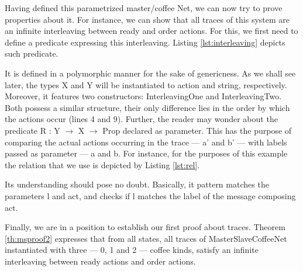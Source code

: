 	\noindent Having defined this parametrized master/coffee \textsf{Net}, we can
	now try to prove properties about it. For instance, we can show that all traces
	of this system are an infinite interleaving between \textsf{ready} and \textsf{order}
	\textsf{actions}. For this, we first need to define a predicate expressing
	this interleaving. Listing \ref{lst:interleaving} depicts such predicate.

					

	\noindent It is defined in a polymorphic manner for the sake of genericness.
	As we shall see later, the types \textsf{X} and \textsf{Y} will be instantiated to
	\textsf{action} and \textsf{string}, respectively.			
	Moreover, it features two constructors: \textsf{InterleavingOne} and \textsf{InterleavingTwo}.
	Both possess a similar structure, their only difference lies in the order
	by which the \textsf{actions} occur (lines 4 and 9). Further, the reader may wonder about
	the predicate \textsf{R : Y $\rightarrow$ X $\rightarrow$ Prop} declared as parameter.
	This has the purpose of comparing the actual \textsf{actions} occurring in the
	trace --- \textsf{a'} and \textsf{b'} --- with labels passed as parameter --- \textsf{a} and \textsf{b}. 
	For instance, for the purposes of this example the relation that we use is depicted by Listing \ref{lst:rel}.	
	
				

	\noindent Its understanding should pose no doubt. Basically, it pattern matches
	the parameters \textsf{l} and \textsf{act}, and checks if \textsf{l} matches 
	the label of the \textsf{message} composing \textsf{act}.
	
	Finally, we are in a position to establish our first proof about traces. Theorem
	\ref{th:msproof2} expresses that from all states, all traces of \textsf{MasterSlaveCoffeeNet} instantiated with three --- 0, 1 and 2 ---
	coffee kinds, satisfy an infinite interleaving between \textsf{ready} \textsf{actions} and \textsf{order}
	\textsf{actions}.
	

